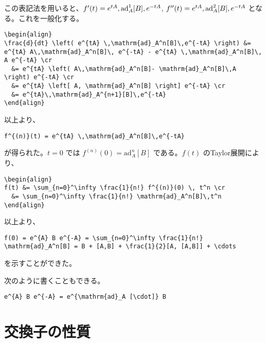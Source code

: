 \documentclass[dvipdfmx]{jsarticle}
\begin{document}
この表記法を用いると、\(f'(t) = e^{tA}\\,\mathrm{ad}_A^1 [B] \\,e^{-tA}\),
\(f''(t) = e^{tA} \\,\mathrm{ad}_A^2 [B] \\,e^{-tA}\)
となる。これを一般化する。

\begin{verbatim}
\begin{align}
\frac{d}{dt} \left( e^{tA} \,\mathrm{ad}_A^n[B]\,e^{-tA} \right) &= e^{tA} A\,\mathrm{ad}_A^n[B]\, e^{-tA} - e^{tA} \,\mathrm{ad}_A^n[B]\, A e^{-tA} \cr
  &= e^{tA} \left( A\,\mathrm{ad}_A^n[B]- \mathrm{ad}_A^n[B]\,A \right) e^{-tA} \cr
  &= e^{tA} \left[ A, \mathrm{ad}_A^n[B] \right] e^{-tA} \cr
  &= e^{tA}\,\mathrm{ad}_A^{n+1}[B]\,e^{-tA}
\end{align}
\end{verbatim}

以上より、

\begin{verbatim}
f^{(n)}(t) = e^{tA} \,\mathrm{ad}_A^n[B]\,e^{-tA}
\end{verbatim}

が得られた。\(t=0\) では \(f^{(n)}(0) = \mathrm{ad}_A^n[B]\)
である。\(f(t)\) のTaylor展開により、

\begin{verbatim}
\begin{align}
f(t) &= \sum_{n=0}^\infty \frac{1}{n!} f^{(n)}(0) \, t^n \cr
  &= \sum_{n=0}^\infty \frac{1}{n!} \mathrm{ad}_A^n[B]\,t^n
\end{align}
\end{verbatim}

以上より、

\begin{verbatim}
f(0) = e^{A} B e^{-A} = \sum_{n=0}^\infty \frac{1}{n!} \mathrm{ad}_A^n[B] = B + [A,B] + \frac{1}{2}[A, [A,B]] + \cdots
\end{verbatim}

を示すことができた。

次のように書くこともできる。

\begin{verbatim}
e^{A} B e^{-A} = e^{\mathrm{ad}_A [\cdot]} B
\end{verbatim}

\hypertarget{ux4ea4ux63dbux5b50ux306eux6027ux8cea}{%
\section{交換子の性質}\label{ux4ea4ux63dbux5b50ux306eux6027ux8cea}}
\end{document}
